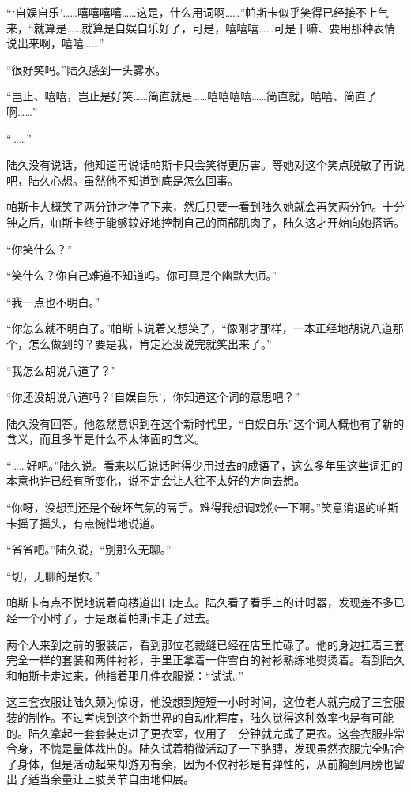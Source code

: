 “‘自娱自乐’……嘻嘻嘻嘻……这是，什么用词啊……”帕斯卡似乎笑得已经接不上气来，“就算是……就算是自娱自乐好了，可是，嘻嘻嘻……可是干嘛、要用那种表情说出来啊，嘻嘻……”

“很好笑吗。”陆久感到一头雾水。

“岂止、嘻嘻，岂止是好笑……简直就是……嘻嘻嘻嘻……简直就，嘻嘻、简直了啊……”

“……”

陆久没有说话，他知道再说话帕斯卡只会笑得更厉害。等她对这个笑点脱敏了再说吧，陆久心想。虽然他不知道到底是怎么回事。

帕斯卡大概笑了两分钟才停了下来，然后只要一看到陆久她就会再笑两分钟。十分钟之后，帕斯卡终于能够较好地控制自己的面部肌肉了，陆久这才开始向她搭话。

“你笑什么？”

“笑什么？你自己难道不知道吗。你可真是个幽默大师。”

“我一点也不明白。”

“你怎么就不明白了。”帕斯卡说着又想笑了，“像刚才那样，一本正经地胡说八道那个，怎么做到的？要是我，肯定还没说完就笑出来了。”

“我怎么胡说八道了？”

“你还没胡说八道吗？‘自娱自乐’，你知道这个词的意思吧？”

陆久没有回答。他忽然意识到在这个新时代里，“自娱自乐”这个词大概也有了新的含义，而且多半是什么不太体面的含义。

“……好吧。”陆久说。看来以后说话时得少用过去的成语了，这么多年里这些词汇的本意也许已经有所变化，说不定会让人往不太好的方向去想。

“你呀，没想到还是个破坏气氛的高手。难得我想调戏你一下啊。”笑意消退的帕斯卡摇了摇头，有点惋惜地说道。

“省省吧。”陆久说，“别那么无聊。”

“切，无聊的是你。”

帕斯卡有点不悦地说着向楼道出口走去。陆久看了看手上的计时器，发现差不多已经一个小时了，于是跟着帕斯卡走了过去。

两个人来到之前的服装店，看到那位老裁缝已经在店里忙碌了。他的身边挂着三套完全一样的套装和两件衬衫，手里正拿着一件雪白的衬衫熟练地熨烫着。看到陆久和帕斯卡走过来，他指着那几件衣服说：“试试。”

这三套衣服让陆久颇为惊讶，他没想到短短一小时时间，这位老人就完成了三套服装的制作。不过考虑到这个新世界的自动化程度，陆久觉得这种效率也是有可能的。陆久拿起一套套装走进了更衣室，仅用了三分钟就完成了更衣。这套衣服非常合身，不愧是量体裁出的。陆久试着稍微活动了一下胳膊，发现虽然衣服完全贴合了身体，但是活动起来却游刃有余，因为不仅衬衫是有弹性的，从前胸到肩膀也留出了适当余量让上肢关节自由地伸展。

